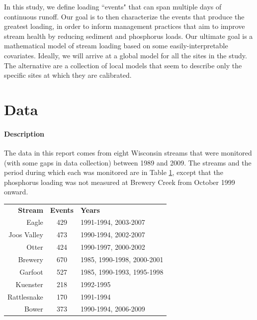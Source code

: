 \documentclass[10pt]{article}
\begin{document}
In this study, we define loading ``events" that can span multiple days of continuous runoff. Our goal is to then characterize the events that produce the greatest loading, in order to inform management practices that aim to improve stream health by reducing sediment and phosphorus loads. Our ultimate goal is a mathematical model of stream loading based on some easily-interpretable covariates. Ideally, we will arrive at a global model for all the sites in the study. The alternative are a collection of local models that seem to describe only the specific sites at which they are calibrated.\\

\section{Data}
\paragraph{Description}
The data in this report comes from eight Wisconsin streams that were monitored (with some gaps in data collection) between 1989 and 2009. The streams and the period during which each was monitored are in Table \ref{table:dates}, except that the phosphorus loading was not measured at Brewery Creek from October 1999 onward.\\

\begin{table}[h]
\begin{center}
\begin{tabular}{r c l}
        \textbf{Stream}  & \textbf{Events} & \textbf{Years}\\
        Eagle & 429 & 1991-1994, 2003-2007\\
        Joos Valley & 473 & 1990-1994, 2002-2007\\
        Otter & 424 & 1990-1997, 2000-2002\\
        Brewery & 670 & 1985, 1990-1998, 2000-2001\\
        Garfoot & 527 & 1985, 1990-1993, 1995-1998\\
        Kuenster & 218 & 1992-1995\\
        Rattlesnake & 170 & 1991-1994\\
        Bower & 373 & 1990-1994, 2006-2009\\
    \end{tabular}
    \label{table:dates}
\end{center}
\end{table}
\end{document}
